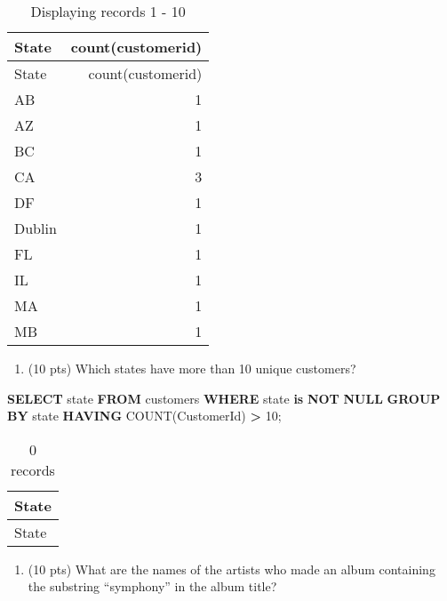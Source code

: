 \documentclass[
]{article}
\newenvironment{Shaded}{\begin{snugshade}}{\end{snugshade}}
\newcommand{\DecValTok}[1]{\textcolor[rgb]{0.00,0.00,0.81}{#1}}
\newcommand{\FunctionTok}[1]{\textcolor[rgb]{0.00,0.00,0.00}{#1}}
\newcommand{\KeywordTok}[1]{\textcolor[rgb]{0.13,0.29,0.53}{\textbf{#1}}}
\newcommand{\NormalTok}[1]{#1}
\newcommand{\OperatorTok}[1]{\textcolor[rgb]{0.81,0.36,0.00}{\textbf{#1}}}
\providecommand{\tightlist}{%
  \setlength{\itemsep}{0pt}\setlength{\parskip}{0pt}}
\begin{document}
\begin{longtable}[]{@{}lr@{}}
\caption{Displaying records 1 - 10}\tabularnewline
\toprule
State & count(customerid) \\
\midrule
\endfirsthead
\toprule
State & count(customerid) \\
\midrule
\endhead
AB & 1 \\
AZ & 1 \\
BC & 1 \\
CA & 3 \\
DF & 1 \\
Dublin & 1 \\
FL & 1 \\
IL & 1 \\
MA & 1 \\
MB & 1 \\
\bottomrule
\end{longtable}

\begin{enumerate}
\def\labelenumi{\arabic{enumi}.}
\setcounter{enumi}{3}
\tightlist
\item
  (10 pts) Which states have more than 10 unique customers?
\end{enumerate}

\begin{Shaded}
\begin{Highlighting}[]

\KeywordTok{SELECT}\NormalTok{ state}
\KeywordTok{FROM}\NormalTok{ customers}
\KeywordTok{WHERE}\NormalTok{ state }\KeywordTok{is} \KeywordTok{NOT} \KeywordTok{NULL}
\KeywordTok{GROUP} \KeywordTok{BY}\NormalTok{ state}
\KeywordTok{HAVING} \FunctionTok{COUNT}\NormalTok{(CustomerId) }\OperatorTok{\textgreater{}} \DecValTok{10}\NormalTok{;}
\end{Highlighting}
\end{Shaded}

\begin{longtable}[]{@{}l@{}}
\caption{0 records}\tabularnewline
\toprule
State \\
\midrule
\endfirsthead
\toprule
State \\
\midrule
\endhead
\bottomrule
\end{longtable}

\begin{enumerate}
\def\labelenumi{\arabic{enumi}.}
\setcounter{enumi}{4}
\tightlist
\item
  (10 pts) What are the names of the artists who made an album
  containing the substring ``symphony'' in the album title?
\end{enumerate}
\end{document}
